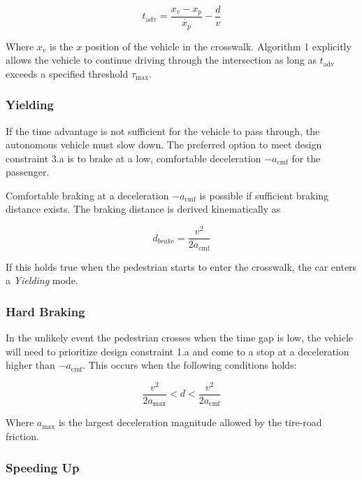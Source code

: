 \documentclass[letterpaper, 10 pt, conference]{ieeeconf} %
\begin{document}
\begin{equation}
t_\mathrm{adv} = \frac{x_v - x_p}{\dot{x_p}} - \frac{d}{v}
\end{equation}

Where $x_v$ is the $x$ position of the vehicle in the crosswalk. Algorithm 1 explicitly allows the vehicle to continue driving through the intersection as long as $t_\mathrm{adv}$ exceeds a specified threshold $\tau_\mathrm{max}$. 

\subsubsection{Yielding}

If the time advantage is not sufficient for the vehicle to pass through, the autonomous vehicle must slow down. The preferred option to meet design constraint 3.a is to brake at a low, comfortable deceleration $-a_\mathrm{cmf}$ for the passenger.

Comfortable braking at a deceleration $-a_\mathrm{cmf}$ is possible if sufficient braking distance exists. The braking distance is derived kinematically as 

\begin{equation}
d_{brake} = \frac{v^2}{2a_\mathrm{cmf}}
\end{equation}

If this holds true when the pedestrian starts to enter the crosswalk, the car enters a \textit{Yielding} mode. 

\subsubsection{Hard Braking}

In the unlikely event the pedestrian crosses when the time gap is low, the vehicle will need to prioritize design constraint 1.a and come to a stop at a deceleration higher than $-a_\mathrm{cmf}$. This occurs when the following conditions holds:

\begin{equation}
\frac{v^2}{2a_\mathrm{max}} < d < \frac{v^2}{2a_\mathrm{cmf}}
\end{equation}

Where $a_\mathrm{max}$ is the largest deceleration magnitude allowed by the tire-road friction. 

\subsubsection{Speeding Up}
\end{document}
